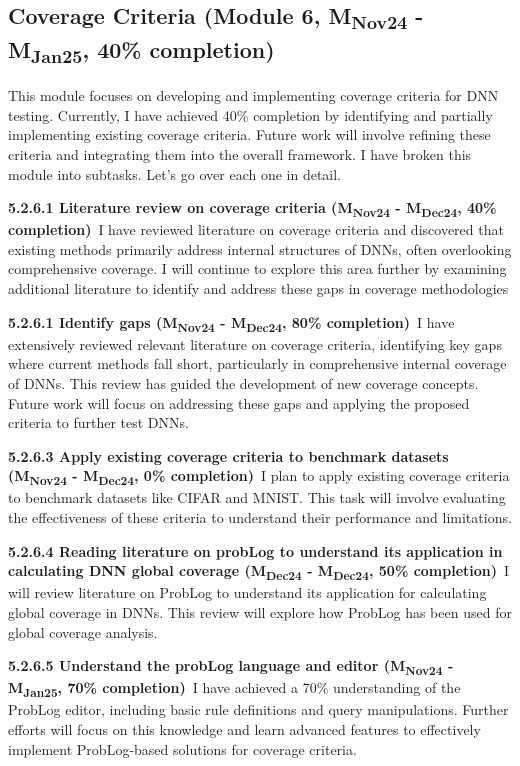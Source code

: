 \subsection{Coverage Criteria (Module 6, M\textsubscript{Nov24} - M\textsubscript{Jan25}, 40\% completion)} This module focuses on developing and implementing coverage criteria for DNN testing. Currently, I have achieved 40\% completion by identifying and partially implementing existing coverage criteria. Future work will involve refining these criteria and integrating them into the overall framework. I have broken this module into subtasks. Let's go over each one in detail.


\noindent \textbf{5.2.6.1 Literature review on coverage criteria (M\textsubscript{Nov24} - M\textsubscript{Dec24}, 40\% completion)}\ I have reviewed literature on coverage criteria and discovered that existing methods primarily address internal structures of DNNs, often overlooking comprehensive coverage. I will continue to explore this area further by examining additional literature to identify and address these gaps in coverage methodologies


\noindent \textbf{5.2.6.1 Identify gaps (M\textsubscript{Nov24} - M\textsubscript{Dec24}, 80\% completion)}\ 
I have extensively reviewed relevant literature on coverage criteria, identifying key gaps where current methods fall short, particularly in comprehensive internal coverage of DNNs. This review has guided the development of new coverage concepts. Future work will focus on addressing these gaps and applying the proposed criteria to further test DNNs.

\noindent \textbf{5.2.6.3 Apply existing coverage criteria to benchmark datasets (M\textsubscript{Nov24} - M\textsubscript{Dec24}, 0\% completion)}\ I plan to apply existing coverage criteria to benchmark datasets like CIFAR and MNIST. This task will involve evaluating the effectiveness of these criteria to understand their performance and limitations. 

\noindent \textbf{5.2.6.4 Reading literature on probLog to understand its application in calculating DNN global coverage (M\textsubscript{Dec24} - M\textsubscript{Dec24}, 50\% completion)}\ I will review literature on ProbLog to understand its application for calculating global coverage in DNNs. This review will explore how ProbLog has been used for global coverage analysis.


\noindent \textbf{5.2.6.5 Understand the probLog language and editor (M\textsubscript{Nov24} - M\textsubscript{Jan25}, 70\% completion)}\ I have achieved a 70\% understanding of the ProbLog editor, including basic rule definitions and query manipulations. Further efforts will focus on this knowledge and learn advanced features to effectively implement ProbLog-based solutions for coverage criteria.

